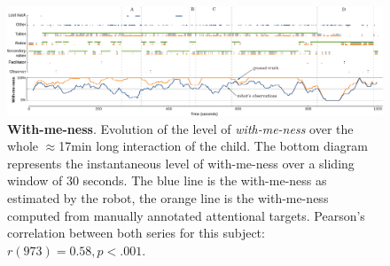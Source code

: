\documentclass[10pt,a4paper]{article}
\begin{document}
\begin{figure}
    \centering
    \includegraphics[width=\linewidth]{with-me-ness}
    \caption{\small \textbf{With-me-ness}. Evolution of the level of
        \emph{with-me-ness} over the whole $\approx$17min long interaction of
        the child. The bottom
        diagram represents the instantaneous level of with-me-ness over a
        sliding window of 30 seconds. The blue line is the with-me-ness as estimated
        by the robot, the orange line is the with-me-ness computed from manually
        annotated attentional targets.  Pearson's correlation between both
        series for this subject: $r(973)=0.58, p < .001$.}

    \label{fig:with-me-ness}
\end{figure}
\end{document}
